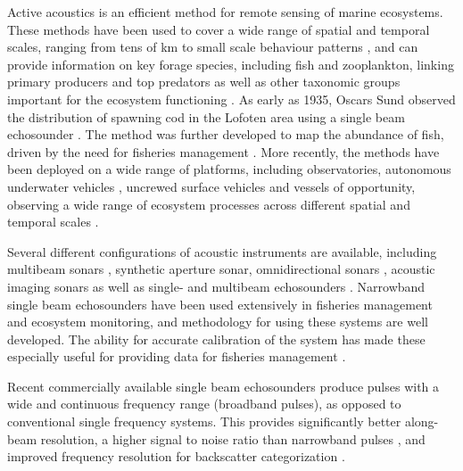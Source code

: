 \documentclass[preprint,12pt,TurnOnLineNumbers]{JASAnew}
\begin{document}
Active acoustics is an efficient method for remote sensing of marine ecosystems. These methods have been used to cover a wide range of spatial and temporal scales, ranging from tens of km \citep{makris_fish_2006} to small scale behaviour patterns \citep{klevjer_split-beam_2003}, and can provide information on key forage species, including fish and zooplankton, linking primary producers and top predators as well as other taxonomic groups important for the ecosystem functioning \citep{benoit-bird_ecological_2016}. As early as 1935, Oscars Sund observed the distribution of spawning cod in the Lofoten area using a single beam echosounder \citep{sund_echo_1935}. The method was further developed to map the abundance of fish, driven by the need for fisheries management \citep{Simmonds2005Fisheries}. More recently, the methods have been deployed on a wide range of platforms, including observatories, autonomous underwater vehicles \citep{fernandes_autonomous_2003}, uncrewed surface vehicles \citep{de_robertis_uncrewed_2021} and vessels of opportunity, observing a wide range of ecosystem processes across different spatial and temporal scales \citep{godo_marine_2014}.

Several different configurations of acoustic instruments are available, including multibeam sonars \citep{gerlotto_two_1999}, synthetic aperture sonar, omnidirectional sonars \citep{misund_improved_1996}, acoustic imaging sonars \citep{jaffe_ftv_1995} as well as single- and multibeam echosounders \citep{trenkel_new_2008}. Narrowband single beam echosounders have been used extensively in fisheries management and ecosystem monitoring, and methodology for using these systems are well developed. The ability for accurate calibration of the system has made these especially useful for providing data for fisheries management \citep{Simmonds2005Fisheries}.

Recent commercially available single beam echosounders produce pulses with a wide and continuous frequency range (broadband pulses), as opposed to conventional single frequency systems. This provides significantly better along-beam resolution, a higher signal to noise ratio than narrowband pulses \citep{Chu1998Application, ehrenbergFMSlideChirp2000}, and  improved frequency resolution for backscatter categorization \citep{korneliussen2018}.
\end{document}
